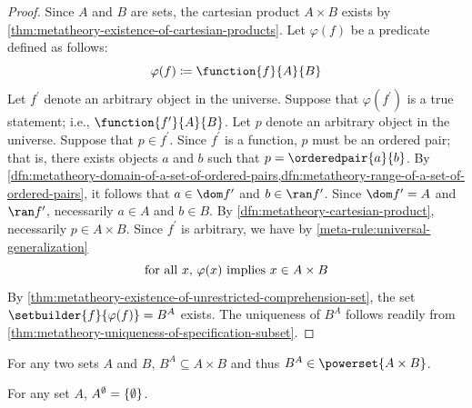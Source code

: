 \begin{proof}
    Since \( A \) and \( B \) are sets, the cartesian product \( A \times B \) exists by \cref{thm:metatheory-existence-of-cartesian-products}.
    Let \( \varphi(f) \) be a predicate defined as follows:
    \begin{equation*}
        \varphi(f) \coloneq \function{f}{A}{B}
    \end{equation*}
    Let \( f^{\prime} \) denote an arbitrary object in the universe.
    Suppose that \( \varphi(f^{\prime}) \) is a true statement; i.e., \( \function{f^{\prime}}{A}{B} \).
    Let \( p \) denote an arbitrary object in the universe.
    Suppose that \( p \in f^{\prime} \).
    Since \( f^{\prime} \) is a function, \( p \) must be an ordered pair;
    that is, there exists objects \( a \) and \( b \) such that \( p = \orderedpair{a}{b} \).
    By \cref{dfn:metatheory-domain-of-a-set-of-ordered-pairs,dfn:metatheory-range-of-a-set-of-ordered-pairs}, it follows that
    \( a \in \dom f^{\prime} \) and \( b \in \ran f^{\prime} \).
    Since \( \dom f^{\prime} = A \) and \( \ran f^{\prime} \), necessarily \( a \in A \) and \( b \in B \).
    By \cref{dfn:metatheory-cartesian-product}, necessarily \( p \in A \times B \).
    Since \( f^{\prime} \) is arbitrary, we have by \cref{meta-rule:universal-generalization}
    \begin{equation*}
        \text{for all \( x \), \( \varphi(x) \) implies \( x \in A \times B \)}
    \end{equation*}
    By \cref{thm:metatheory-existence-of-unrestricted-comprehension-set}, the set \( \setbuilder{f}{\varphi(f)} = B^{A} \) exists.
    The uniqueness of \( B^{A} \) follows readily from \cref{thm:metatheory-uniqueness-of-specification-subset}.
\end{proof}

\begin{cor}
     \label{cor:metatheory-set-exponentiation-is-the-subset-of-cartesian-product-and-element-of-power-set-of-cartesian-product}
    For any two sets \( A \) and \( B \), \( B^{A} \subseteq A \times B \) and thus \( B^{A} \in \powerset{A \times B} \).
\end{cor}

\begin{thm}
     \label{thm:metatheory-exponentiation-with-empty-exponent}
    For any set \( A \), \( A^{\emptyset} = \mleft\{ \emptyset \mright\} \).
\end{thm}


